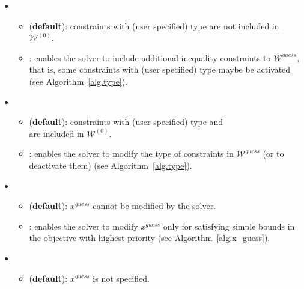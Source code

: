 \documentclass[12pt,a4paper]{article}
\begin{document}
\begin{itemize}

\item {}

  \begin{itemize}
  \item[\ding{237}]  ({\bf default}): constraints with (user specified) type  are not included in $\mathcal{W}^{(0)}$.
  \item[\ding{237}] : enables the solver to include additional inequality constraints to
    $\mathcal{W}^{\mathit{guess}}$, that is, some constraints with (user specified) type
     maybe be activated (see Algorithm~\ref{alg.type}).
  \end{itemize}

\item {}

  \begin{itemize}
  \item[\ding{237}]  ({\bf default}): constraints with (user specified) type  and \\  are included in $\mathcal{W}^{(0)}$.
  \item[\ding{237}] : enables the solver to modify the type of constraints in $\mathcal{W}^{\mathit{guess}}$ (or to deactivate them) (see Algorithm~\ref{alg.type}).
  \end{itemize}

\item {}

  \begin{itemize}
  \item[\ding{237}]  ({\bf default}): $x^{\mathit{guess}}$ cannot be modified by the solver.
  \item[\ding{237}] : enables the solver to modify $x^{\mathit{guess}}$ only for satisfying simple
    bounds in the objective with highest priority (see Algorithm~\ref{alg.x_guess}).
  \end{itemize} 

\item {}

  \begin{itemize}
  \item[\ding{237}]  ({\bf default}): $x^{\mathit{guess}}$ is not specified.


\end{itemize}
\end{itemize}
\end{document}

